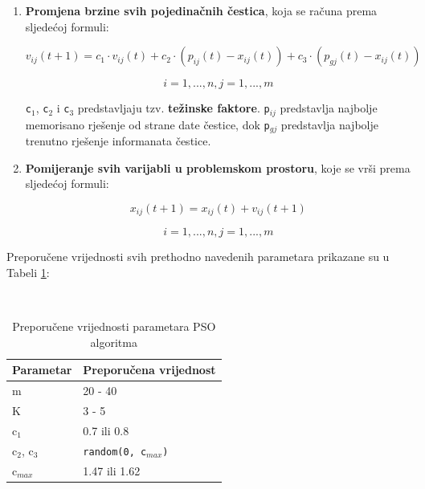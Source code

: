 \documentclass[12pt, a4paper]{article}
\begin{document}
\begin{enumerate}

\item \textbf{Promjena brzine svih pojedinačnih čestica}, koja se računa prema sljedećoj formuli:

\begin{equation}
v_{ij}(t + 1) = c_1 \cdot v_{ij}(t) + c_2 \cdot (p_{ij}(t) - x_{ij}(t)) + c_3 \cdot (p_{gj}(t) - x_{ij}(t))
\end{equation}

\begin{equation*}
i = 1, ..., n, j = 1, ..., m
\end{equation*}

\texttt{c$_1$}, \texttt{c$_2$} i \texttt{c$_3$} predstavljaju tzv. \textbf{težinske faktore}. \texttt{p$_{ij}$} predstavlja najbolje memorisano rješenje od strane date čestice, dok \texttt{p$_{gj}$} predstavlja najbolje trenutno rješenje informanata čestice.

\item \textbf{Pomijeranje svih varijabli u problemskom prostoru}, koje se vrši prema sljedećoj formuli:

\begin{equation}
x_{ij}(t + 1) = x_{ij}(t) + v_{ij}(t + 1)
\end{equation}

\begin{equation*}
i = 1, ..., n, j = 1, ..., m
\end{equation*}

\end{enumerate}

Preporučene vrijednosti svih prethodno navedenih parametara prikazane su u Tabeli \ref{parameters}: \cite{samke}

~\\

\begin{table}[H]
\centering
\begin{tabular}{| p{4cm} | p{5cm} |}
\hline
\textbf{Parametar}		& \textbf{Preporučena vrijednost} 			\\ \hline
m 						& 20 - 40								\\ \hline
K						& 3 - 5									\\ \hline
c$_1$					& 0.7 ili 0.8								\\ \hline
c$_2$, c$_3$			& \texttt{random(0, c$_{max}$)}			\\ \hline
c$_{max}$				& 1.47 ili 1.62							\\ \hline
\end{tabular}
\caption{Preporučene vrijednosti parametara PSO algoritma}
\label{parameters}
\end{table}
\end{document}
